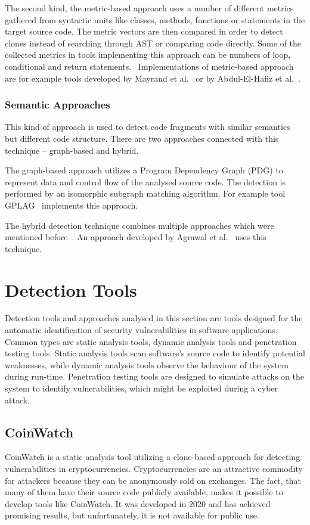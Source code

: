     The second kind, the metric-based approach uses a number of different metrics gathered from syntactic units
    like classes, methods, functions or statements in the target source code. The metric vectors are then compared
    in order to detect clones instead of searching through AST or comparing code directly. Some of the collected
    metrics in tools implementing this approach can be numbers of loop, conditional and return
    statements.~\cite{CloneDetectionTechniques, CodeClonesSurvey}
    Implementations of metric-based approach are for example tools developed by Mayrand et al.~\cite{MBMayrand}
    or by Abdul-El-Hafiz et al.~\cite{MDAbdul}.

  \subsubsection*{Semantic Approaches}
    This kind of approach is used to detect code fragments with similar semantics but different code structure.
    There are two approaches connected with this technique -- graph-based and hybrid.

    The graph-based approach utilizes a Program Dependency Graph (PDG) to represent data and control
    flow of the analysed source code. The detection is performed by an isomorphic subgraph matching algorithm.
    For example tool GPLAG~\cite{GPLAG} implements this approach.

    The hybrid detection technique combines multiple approaches which were mentioned
    before~\cite{CloneDetectionTechniques, CodeClonesSurvey}. An approach developed by Agrawal et
    al.~\cite{HybridAgrawal} uses this technique.

\section{Detection Tools}
Detection tools and approaches analysed in this section are tools designed for the automatic identification of
security vulnerabilities in software applications. Common types are static analysis tools,
dynamic analysis tools and penetration testing tools. Static analysis tools scan software's source code
to identify potential weaknesses, while dynamic analysis tools observe the behaviour of the system during
run-time. Penetration testing tools are designed to simulate attacks on the system to identify
vulnerabilities, which might be exploited during a cyber attack.

  \subsection*{CoinWatch}
    CoinWatch is a static analysis tool utilizing a clone-based approach for detecting vulnerabilities
    in cryptocurrencies. Cryptocurrencies are an attractive commodity for attackers because they can be
    anonymously sold on exchanges. The fact, that many of them have their source code publicly available,
    makes it possible to develop tools like CoinWatch. It was developed in 2020 and has achieved promising
    results, but unfortunately, it is not available for public use.

